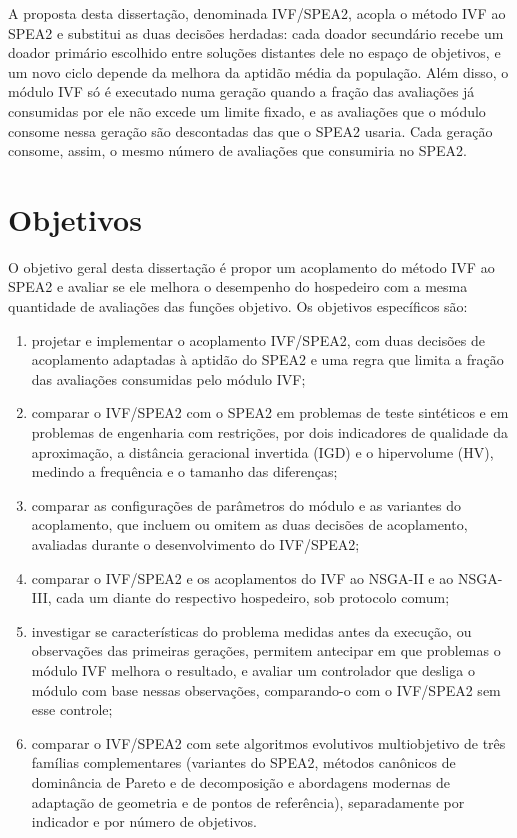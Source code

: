 A proposta desta dissertação, denominada IVF/SPEA2, acopla o método IVF ao SPEA2 e substitui as duas decisões herdadas: cada doador secundário recebe um doador primário escolhido entre soluções distantes dele no espaço de objetivos, e um novo ciclo depende da melhora da aptidão média da população. Além disso, o módulo IVF só é executado numa geração quando a fração das avaliações já consumidas por ele não excede um limite fixado, e as avaliações que o módulo consome nessa geração são descontadas das que o SPEA2 usaria. Cada geração consome, assim, o mesmo número de avaliações que consumiria no SPEA2.

\section{Objetivos}
\label{sec:objetivos}

O objetivo geral desta dissertação é propor um acoplamento do método IVF ao SPEA2 e avaliar se ele melhora o desempenho do hospedeiro com a mesma quantidade de avaliações das funções objetivo. Os objetivos específicos são:

\begin{enumerate}
    \item projetar e implementar o acoplamento IVF/SPEA2, com duas decisões de acoplamento adaptadas à aptidão do SPEA2 e uma regra que limita a fração das avaliações consumidas pelo módulo IVF;
    \item comparar o IVF/SPEA2 com o SPEA2 em problemas de teste sintéticos e em problemas de engenharia com restrições, por dois indicadores de qualidade da aproximação, a distância geracional invertida (IGD) e o hipervolume (HV), medindo a frequência e o tamanho das diferenças;
    \item comparar as configurações de parâmetros do módulo e as variantes do acoplamento, que incluem ou omitem as duas decisões de acoplamento, avaliadas durante o desenvolvimento do IVF/SPEA2;
    \item comparar o IVF/SPEA2 e os acoplamentos do IVF ao NSGA-II e ao NSGA-III, cada um diante do respectivo hospedeiro, sob protocolo comum;
    \item investigar se características do problema medidas antes da execução, ou observações das primeiras gerações, permitem antecipar em que problemas o módulo IVF melhora o resultado, e avaliar um controlador que desliga o módulo com base nessas observações, comparando-o com o IVF/SPEA2 sem esse controle;
    \item comparar o IVF/SPEA2 com sete algoritmos evolutivos multiobjetivo de três famílias complementares (variantes do SPEA2, métodos canônicos de dominância de Pareto e de decomposição e abordagens modernas de adaptação de geometria e de pontos de referência), separadamente por indicador e por número de objetivos.
\end{enumerate}

